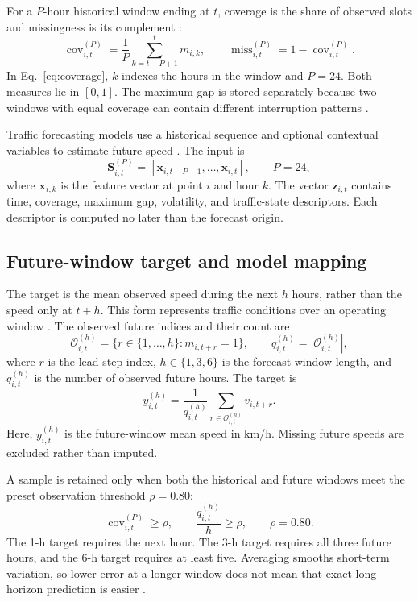 \documentclass[smallcondensed]{svjour3}
\newcommand{\vect}[1]{\boldsymbol{#1}}
\begin{document}
For a $P$-hour historical window ending at $t$, coverage is the share of observed slots and missingness is its complement \cite{ref8,ref9}:
\begin{equation}
\operatorname{cov}_{i,t}^{(P)}
=\frac{1}{P}\sum_{k=t-P+1}^{t}m_{i,k},
\qquad
\operatorname{miss}_{i,t}^{(P)}
=1-\operatorname{cov}_{i,t}^{(P)}.
\label{eq:coverage}
\end{equation}
In Eq.~\eqref{eq:coverage}, $k$ indexes the hours in the window and $P=24$. Both measures lie in $[0,1]$. The maximum gap is stored separately because two windows with equal coverage can contain different interruption patterns \cite{ref9}.

Traffic forecasting models use a historical sequence and optional contextual variables to estimate future speed \cite{ref1,ref3,ref4}. The input is
\begin{equation}
\vect{S}_{i,t}^{(P)}
=
[\vect{x}_{i,t-P+1},\ldots,\vect{x}_{i,t}],
\qquad P=24,
\label{eq:input}
\end{equation}
where $\vect{x}_{i,k}$ is the feature vector at point $i$ and hour $k$. The vector $\vect{z}_{i,t}$ contains time, coverage, maximum gap, volatility, and traffic-state descriptors. Each descriptor is computed no later than the forecast origin.

\subsection{Future-window target and model mapping}
The target is the mean observed speed during the next $h$ hours, rather than the speed only at $t+h$. This form represents traffic conditions over an operating window \cite{ref5,ref6}. The observed future indices and their count are
\begin{equation}
\mathcal{O}_{i,t}^{(h)}
=
\{r\in\{1,\ldots,h\}:m_{i,t+r}=1\},
\qquad
q_{i,t}^{(h)}=|\mathcal{O}_{i,t}^{(h)}|,
\label{eq:targetset}
\end{equation}
where $r$ is the lead-step index, $h\in\{1,3,6\}$ is the forecast-window length, and $q_{i,t}^{(h)}$ is the number of observed future hours. The target is
\begin{equation}
y_{i,t}^{(h)}
=
\frac{1}{q_{i,t}^{(h)}}
\sum_{r\in\mathcal{O}_{i,t}^{(h)}}v_{i,t+r}.
\label{eq:target}
\end{equation}
Here, $y_{i,t}^{(h)}$ is the future-window mean speed in km/h. Missing future speeds are excluded rather than imputed.

A sample is retained only when both the historical and future windows meet the preset observation threshold $\rho=0.80$:
\begin{equation}
\operatorname{cov}_{i,t}^{(P)}\geq\rho,
\qquad
\frac{q_{i,t}^{(h)}}{h}\geq\rho,
\qquad
\rho=0.80.
\label{eq:eligibility}
\end{equation}
The 1-h target requires the next hour. The 3-h target requires all three future hours, and the 6-h target requires at least five. Averaging smooths short-term variation, so lower error at a longer window does not mean that exact long-horizon prediction is easier \cite{ref6,ref19}.
\end{document}
